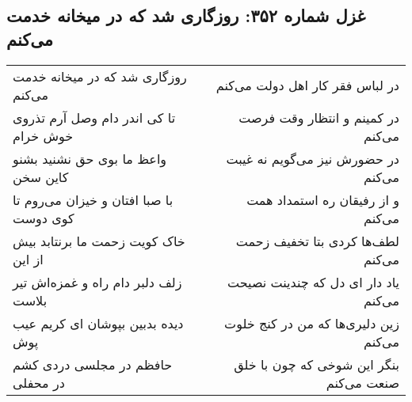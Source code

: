\begin{center}
\section*{غزل شماره ۳۵۲: روزگاری شد که در میخانه خدمت می‌کنم}
\label{sec:sh352}
\begin{longtable}{l p{0.5cm} r}
روزگاری شد که در میخانه خدمت می‌کنم
&&
در لباس فقر کار اهل دولت می‌کنم
\\
تا کی اندر دام وصل آرم تذروی خوش خرام
&&
در کمینم و انتظار وقت فرصت می‌کنم
\\
واعظ ما بوی حق نشنید بشنو کاین سخن
&&
در حضورش نیز می‌گویم نه غیبت می‌کنم
\\
با صبا افتان و خیزان می‌روم تا کوی دوست
&&
و از رفیقان ره استمداد همت می‌کنم
\\
خاک کویت زحمت ما برنتابد بیش از این
&&
لطف‌ها کردی بتا تخفیف زحمت می‌کنم
\\
زلف دلبر دام راه و غمزه‌اش تیر بلاست
&&
یاد دار ای دل که چندینت نصیحت می‌کنم
\\
دیده بدبین بپوشان ای کریم عیب پوش
&&
زین دلیری‌ها که من در کنج خلوت می‌کنم
\\
حافظم در مجلسی دردی کشم در محفلی
&&
بنگر این شوخی که چون با خلق صنعت می‌کنم
\\
\end{longtable}
\end{center}
